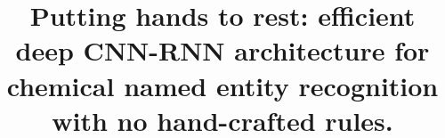 \documentclass[twocolumn]{bmcart}%
\begin{document}
\begin{frontmatter}

\begin{fmbox}


\title{Putting hands to rest: efficient deep CNN-RNN architecture for chemical named entity recognition with no hand-crafted rules.}


\author[
   addressref={aff1, aff2, aff3},       %
   corref={aff1},                       %
   email={ilia.korvigo@gmail.com}   %
]{ }
\author[
   addressref={aff4, aff5},
   email={maksim.holmatov@gmail.com}
]{ }
\author[
   addressref={aff6},
   email={st010379@student.spbu.ru}
]{ }
\author[
   addressref={aff1},
   email={mskoblov@gmail.com}
]{ }



\end{fmbox}
\end{frontmatter}
\end{document}
